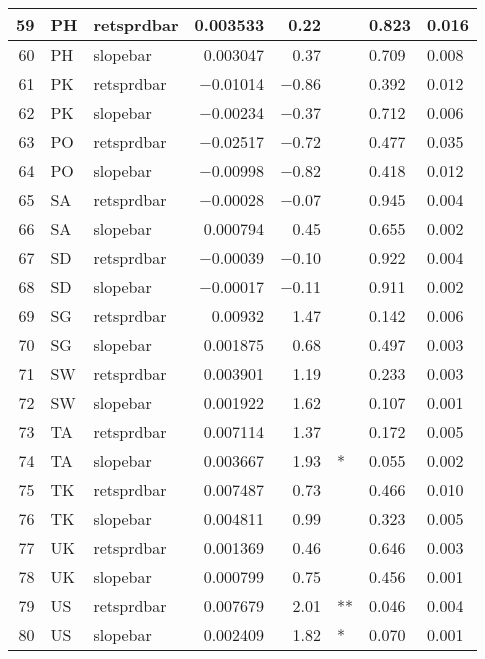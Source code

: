\begin{longtable}{|r|l|l|r|r|l|l|l|}
   59 &    PH &    retsprdbar &    0.003533 &    0.22 &      &    0.823 &    0.016\\\hline
   60 &    PH &    slopebar &    0.003047 &    0.37 &      &    0.709 &    0.008\\\hline
   61 &    PK &    retsprdbar &    $-$0.01014 &    $-$0.86 &      &    0.392 &    0.012\\\hline
   62 &    PK &    slopebar &    $-$0.00234 &    $-$0.37 &      &    0.712 &    0.006\\\hline
   63 &    PO &    retsprdbar &    $-$0.02517 &    $-$0.72 &      &    0.477 &    0.035\\\hline
   64 &    PO &    slopebar &    $-$0.00998 &    $-$0.82 &      &    0.418 &    0.012\\\hline
   65 &    SA &    retsprdbar &    $-$0.00028 &    $-$0.07 &      &    0.945 &    0.004\\\hline
   66 &    SA &    slopebar &    0.000794 &    0.45 &      &    0.655 &    0.002\\\hline
   67 &    SD &    retsprdbar &    $-$0.00039 &    $-$0.10 &      &    0.922 &    0.004\\\hline
   68 &    SD &    slopebar &    $-$0.00017 &    $-$0.11 &      &    0.911 &    0.002\\\hline
   69 &    SG &    retsprdbar &    0.00932 &    1.47 &      &    0.142 &    0.006\\\hline
   70 &    SG &    slopebar &    0.001875 &    0.68 &      &    0.497 &    0.003\\\hline
   71 &    SW &    retsprdbar &    0.003901 &    1.19 &      &    0.233 &    0.003\\\hline
   72 &    SW &    slopebar &    0.001922 &    1.62 &      &    0.107 &    0.001\\\hline
   73 &    TA &    retsprdbar &    0.007114 &    1.37 &      &    0.172 &    0.005\\\hline
   74 &    TA &    slopebar &    0.003667 &    1.93 &    * &    0.055 &    0.002\\\hline
   75 &    TK &    retsprdbar &    0.007487 &    0.73 &      &    0.466 &    0.010\\\hline
   76 &    TK &    slopebar &    0.004811 &    0.99 &      &    0.323 &    0.005\\\hline
   77 &    UK &    retsprdbar &    0.001369 &    0.46 &      &    0.646 &    0.003\\\hline
   78 &    UK &    slopebar &    0.000799 &    0.75 &      &    0.456 &    0.001\\\hline
   79 &    US &    retsprdbar &    0.007679 &    2.01 &    ** &    0.046 &    0.004\\\hline
   80 &    US &    slopebar &    0.002409 &    1.82 &    * &    0.070 &    0.001\\\hline
\end{longtable}

